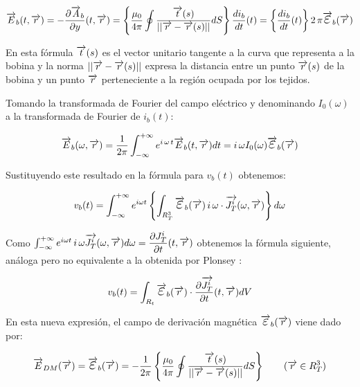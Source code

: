 \begin{equation}
	\label{eq:625}
\V{E}_{b}(t,\V{r})=	-\dP{\V{A}_{b}}{y}(t,\V{r})=\left\lbrace    \dfrac{\mu_{0}}{4\pi} \oint \dfrac{\V{t}(s)}{\vert\vert \V{r}-\V{r}(s) \vert\vert } dS       \right\rbrace \dT{i_{b}}{t}(t)=\left\lbrace \dT{i_{b}}{t}(t) \right\rbrace 2\,\pi\V{\Bb{\varepsilon}}_{b}(\V{r})
\end{equation}

En esta fórmula $\overrightarrow{t}(s)$ es el vector unitario tangente a la curva que representa a la bobina y la norma $\vert\vert \overrightarrow{r}-\overrightarrow{r}(s) \vert\vert$ expresa la distancia entre un punto $\overrightarrow{r}(s)$ de la bobina y un punto $\overrightarrow{r}$ perteneciente a la región ocupada por los tejidos.

Tomando la transformada de Fourier del campo eléctrico y denominando $I_{0}(\omega)$ a la transformada de Fourier de $i_{b}(t)$:

\begin{equation}
\V{E}_{b}(\omega,\V{r})= \dfrac{1}{2\pi} \int_{-\infty}^{+\infty} e^{i\,\omega\,t} \V{E}_{b}(t,\V{r})dt = i \, \omega I_{0}(\omega)\V{\Bb{\varepsilon}}_{b}(\V{r})
\end{equation}

Sustituyendo este resultado en la fórmula para $v_{b}(t)$ obtenemos:

\begin{equation}
	v_{b}(t)=\int_{-\infty}^{+\infty} e^{i\omega t}\left\lbrace  \int_{R^{3}_{T}}  \V{\Bb{\varepsilon}}_{b}(\V{r})   \, i \, \omega         \cdot \V{J_{T}^{i}}(\omega,\V{r}) \right\rbrace d\omega
\end{equation}


Como ${\int_{-\infty}^{+\infty} e^{i\omega t} \, i \, \omega \overrightarrow{J_{T}^{i}}(\omega,\overrightarrow{r}) d\omega = \dfrac{\partial J_{T}^{i}}{\partial t}(t, \overrightarrow{r})}$ obtenemos la fórmula siguiente, análoga pero no equivalente a la obtenida por Plonsey :


\begin{equation}
	v_{b}(t)=\int_{R_{t}} \V{\Bb{\varepsilon}}_{b}(\V{r})\cdot \dP{\V{J_{T}^{i}}}{t}(t, \V{r}) dV
\end{equation}

En esta nueva expresión, el campo de derivación magnética $\V{\Bb{\varepsilon}}_{b}(\V{r})$ viene dado por:

\begin{equation}
	\V{E}_{DM}(\V{r})=\V{\Bb{\varepsilon}}_{b}(\V{r})= -\dfrac{1}{2\pi} \left\lbrace    \dfrac{\mu_{0}}{4\pi} \oint \dfrac{\V{t}(s)}{\vert\vert \V{r}-\V{r}(s) \vert\vert } dS  \right\rbrace \quad \quad (\V{r} \in R_{T}^{3})
\end{equation}


